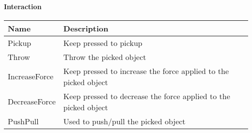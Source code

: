 \paragraph{Interaction}
\begin{center}
	\centering
	\begin{longtable}{ | l | p{10cm} |}
	\hline
	Name	& Description \\ \hline
	Pickup			&	Keep pressed to pickup\\
	Throw			&	Throw the picked object\\
	IncreaseForce	&	Keep pressed to increase the force applied to the picked object\\
	DecreaseForce	&	Keep pressed to decrease the force applied to the picked object\\
	PushPull		&	Used to push/pull the picked object\\
	\hline
	\end{longtable}
\end{center}
